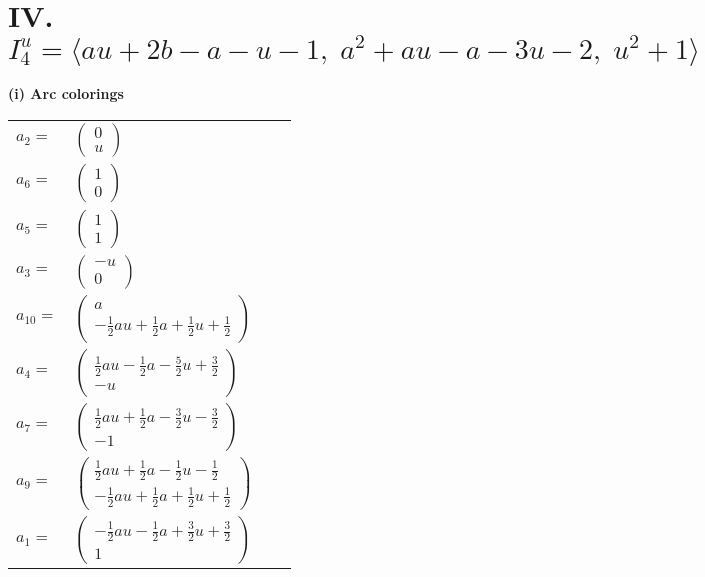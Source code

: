 \documentclass[1p]{elsarticle_modified}
\theoremstyle{definition}
\begin{document}
\centering \section*{IV. $I^u_{4}= \langle a u+2 b- a- u-1,\;a^2+a u- a-3 u-2,\;u^2+1 \rangle$}
\flushleft \textbf{(i) Arc colorings}\\
\begin{tabular}{m{7pt} m{180pt} m{7pt} m{180pt} }
\flushright $a_{2}=$&$\begin{pmatrix}0\\u\end{pmatrix}$ \\
\flushright $a_{6}=$&$\begin{pmatrix}1\\0\end{pmatrix}$ \\
\flushright $a_{5}=$&$\begin{pmatrix}1\\1\end{pmatrix}$ \\
\flushright $a_{3}=$&$\begin{pmatrix}- u\\0\end{pmatrix}$ \\
\flushright $a_{10}=$&$\begin{pmatrix}a\\-\frac{1}{2} a u+\frac{1}{2} a+\frac{1}{2} u+\frac{1}{2}\end{pmatrix}$ \\
\flushright $a_{4}=$&$\begin{pmatrix}\frac{1}{2} a u-\frac{1}{2} a-\frac{5}{2} u+\frac{3}{2}\\- u\end{pmatrix}$ \\
\flushright $a_{7}=$&$\begin{pmatrix}\frac{1}{2} a u+\frac{1}{2} a-\frac{3}{2} u-\frac{3}{2}\\-1\end{pmatrix}$ \\
\flushright $a_{9}=$&$\begin{pmatrix}\frac{1}{2} a u+\frac{1}{2} a-\frac{1}{2} u-\frac{1}{2}\\-\frac{1}{2} a u+\frac{1}{2} a+\frac{1}{2} u+\frac{1}{2}\end{pmatrix}$ \\
\flushright $a_{1}=$&$\begin{pmatrix}-\frac{1}{2} a u-\frac{1}{2} a+\frac{3}{2} u+\frac{3}{2}\\1\end{pmatrix}$ \\

\end{tabular}
\end{document}
